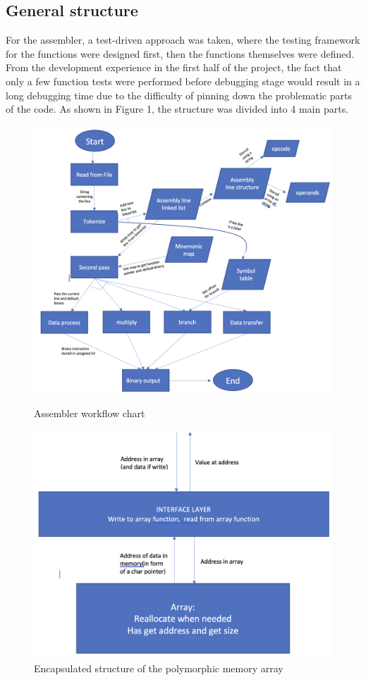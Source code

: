 \documentclass[10pt]{article}
\begin{document}
\subsection{General structure}
For the assembler, a test-driven approach was taken, where the testing framework for the functions were designed first, then the functions themselves were defined. From the development experience in the first half of the project, the fact that only a few function tests were performed before debugging stage would result in a long debugging time due to the difficulty of pinning down the problematic parts of the code.
As shown in Figure 1, the structure was divided into 4 main parts.
\begin{figure}
\centering
\begin{minipage}{.5\textwidth}
\centering
\includegraphics[width = \linewidth]{ flow }
\caption{Assembler workflow chart}
\label{fig:assembler}
\end{minipage}\hfill
\begin{minipage}{.5\textwidth}
\centering
\includegraphics[width = \linewidth]{ mem_array }
\caption{Encapsulated structure of the polymorphic memory array}
\label{fig:mem_array}
\end{minipage}
\end{figure}
\end{document}
